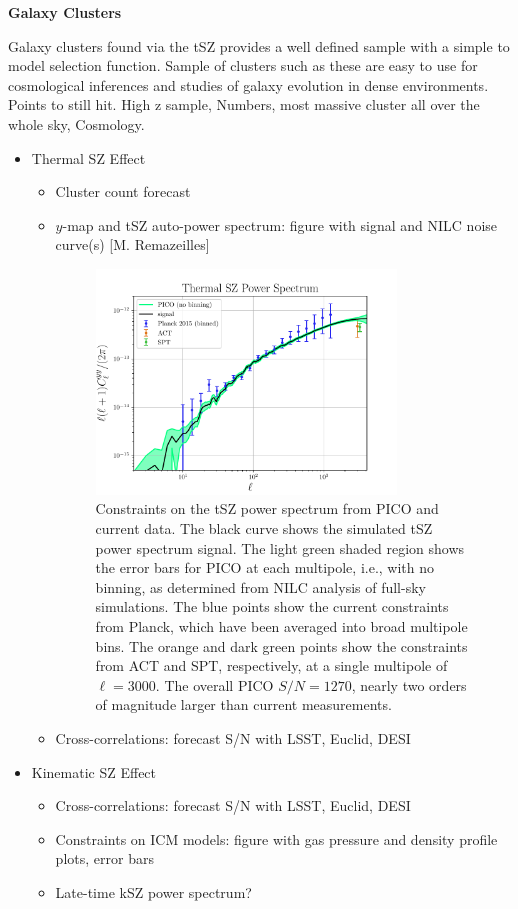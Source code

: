 \documentclass[PICOReport.tex]{subfiles}
\begin{document}
{\bf Galaxy Clusters}


Galaxy clusters found via the tSZ provides a well defined sample with a simple to model selection function. Sample of clusters such as these are easy to use for cosmological inferences and studies of galaxy evolution in dense environments. 
Points to still hit.
High z sample,
Numbers,
most massive cluster all over the whole sky,
Cosmology.

\begin{itemize}
\item{Thermal SZ Effect}
\begin{itemize}
\item Cluster count forecast
\item{$y$-map and tSZ auto-power spectrum: figure with signal and NILC noise curve(s) [M. Remazeilles]}

\begin{figure}
\includegraphics[width=0.8\textwidth]{images/PICO_tSZ_PS_plot.pdf}
\caption{\label{fig:PICO_tSZ_PS} Constraints on the tSZ power spectrum from PICO and current data.  The black curve shows the simulated tSZ power spectrum signal.  The light green shaded region shows the error bars for PICO at each multipole, i.e., with no binning, as determined from NILC analysis of full-sky simulations.  The blue points show the current constraints from Planck, which have been averaged into broad multipole bins.  The orange and dark green points show the constraints from ACT and SPT, respectively, at a single multipole of $\ell=3000$.  The overall PICO $S/N = 1270$, nearly two orders of magnitude larger than current measurements.}
\end{figure}

\item Cross-correlations: forecast S/N with LSST, Euclid, DESI
\end{itemize}
\item Kinematic SZ Effect
\begin{itemize}
\item Cross-correlations: forecast S/N with LSST, Euclid, DESI
\item Constraints on ICM models: figure with gas pressure and density profile plots, error bars
\item Late-time kSZ power spectrum?
\end{itemize}
\end{itemize}
\end{document}
